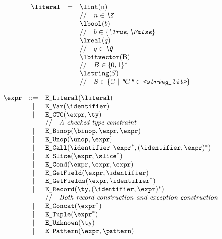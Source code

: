 \documentclass{book}
\begin{document}
\[\begin{array}{rcl}
\literal &=& \lint($n$) \\
 & & \ASTComment{$n \in \Z$}\\
 &|& \lbool(b) \\
 & & \ASTComment{$b \in \{\True, \False\}$}\\
 &|& \lreal(q)  \\
 & & \ASTComment{$q \in \Q$}\\
 &|& \lbitvector($B$)   \\
 & & \ASTComment{$B \in \{0, 1\}^*$}\\
 &|& \lstring(S)\\
 & & \ASTComment{$S \in \{C \;|\; \texttt{"$C$"} \in \texttt{<string\_lit>}\} $}\\
\end{array}
\]

\[
\begin{array}{rcl}
\expr &::=& \texttt{E\_Literal}(\literal) \\
	&|& \texttt{E\_Var}(\texttt{\identifier}) \\
	&|& \texttt{E\_CTC}(\texttt{\expr}, \ty) \\
  & & \ASTComment{A checked type constraint}\\
	&|& \texttt{E\_Binop}(\binop, \expr, \expr) \\
	&|& \texttt{E\_Unop}(\unop, \expr) \\
	&|& \texttt{E\_Call}(\identifier, \expr^{*}, (\identifier, \expr)^{*}) \\
	&|& \texttt{E\_Slice}(\expr, \slice^{*}) \\
	&|& \texttt{E\_Cond}(\expr, \expr, \expr) \\
	&|& \texttt{E\_GetField}(\expr, \identifier) \\
	&|& \texttt{E\_GetFields}(\expr, \identifier^{*}) \\
	&|& \texttt{E\_Record}(\ty, (\identifier, \expr)^{*})\\
    & & \ASTComment{Both record construction and exception construction}\\
	&|& \texttt{E\_Concat}(\expr^{*}) \\
	&|& \texttt{E\_Tuple}(\expr^{*}) \\
	&|& \texttt{E\_Unknown}(\ty) \\
	&|& \texttt{E\_Pattern}(\expr, \pattern)
\end{array}
\]
\end{document}
